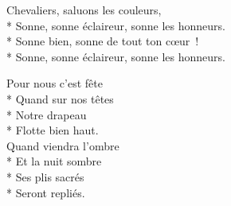 {\centering
	Chevaliers, saluons les couleurs,\\*
	Sonne, sonne éclaireur, sonne les honneurs.\\*
	Sonne bien, sonne de tout ton cœur !\\*
	Sonne, sonne éclaireur, sonne les honneurs.
	
	Pour nous c’est fête\\*
	Quand sur nos têtes\\*
	Notre drapeau\\*
	Flotte bien haut.\\
	Quand viendra l’ombre\\*
	Et la nuit sombre\\*
	Ses plis sacrés\\*
	Seront repliés.
	
}
